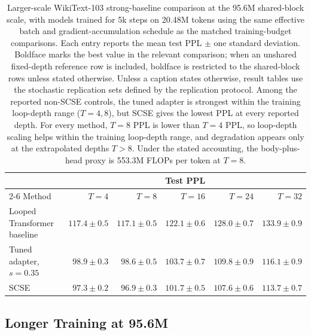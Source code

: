 \documentclass[letterpaper]{article} %
\newcommand{\SCSE}{\textsc{SCSE}}
\theoremstyle{remark}
\begin{document}
\begin{table}[t!]
	\centering
	\scriptsize
	\begin{tabular}{lrrrrr}
		\toprule
		                            & \multicolumn{5}{c}{Test PPL}                                                                                                    \\
		\cmidrule(lr){2-6}
		Method                      & $T=4$                        & $T=8$                 & $T=16$                 & $T=24$                 & $T=32$                 \\
		\midrule
		Looped Transformer baseline & $117.4\pm0.5$                & $117.1\pm0.5$         & $122.1\pm0.6$          & $128.0\pm0.7$          & $133.9\pm0.9$          \\
		Tuned adapter, $s=0.35$     & $98.9\pm0.3$                 & $98.6\pm0.5$          & $103.7\pm0.7$          & $109.8\pm0.9$          & $116.1\pm0.9$          \\
		\SCSE{}                     & $\mathbf{97.3\pm0.2}$        & $\mathbf{96.9\pm0.3}$ & $\mathbf{101.7\pm0.5}$ & $\mathbf{107.6\pm0.6}$ & $\mathbf{113.7\pm0.7}$ \\
		\bottomrule
	\end{tabular}
	\caption{Larger-scale WikiText-103 strong-baseline comparison at the 95.6M shared-block scale, with models trained for 5k steps on 20.48M tokens using the same effective batch and gradient-accumulation schedule as the matched training-budget comparisons.  Each entry reports the mean test PPL $\pm$ one standard deviation.  Boldface marks the best value in the relevant comparison; when an unshared fixed-depth reference row is included, boldface is restricted to the shared-block rows unless stated otherwise.  Unless a caption states otherwise, result tables use the stochastic replication sets defined by the replication protocol.  Among the reported non-\SCSE{} controls, the tuned adapter is strongest within the training loop-depth range ($T=4,8$), but \SCSE{} gives the lowest PPL at every reported depth.  For every method, $T=8$ PPL is lower than $T=4$ PPL, so loop-depth scaling helps within the training loop-depth range, and degradation appears only at the extrapolated depths $T>8$.  Under the stated accounting, the body-plus-head proxy is 553.3M FLOPs per token at $T=8$.}
	\label{tab:scale95m}
\end{table}

\subsection{Longer Training at 95.6M}
\label{app:longer-training-95m}
\end{document}
